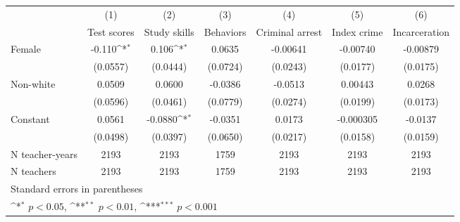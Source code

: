 {
\def\sym#1{\ifmmode^{#1}\else\(^{#1}\)\fi}
\begin{tabular}{l*{6}{c}}
\hline\hline
            &\multicolumn{1}{c}{(1)}&\multicolumn{1}{c}{(2)}&\multicolumn{1}{c}{(3)}&\multicolumn{1}{c}{(4)}&\multicolumn{1}{c}{(5)}&\multicolumn{1}{c}{(6)}\\
            &\multicolumn{1}{c}{Test scores}&\multicolumn{1}{c}{Study skills}&\multicolumn{1}{c}{Behaviors}&\multicolumn{1}{c}{Criminal arrest}&\multicolumn{1}{c}{Index crime}&\multicolumn{1}{c}{Incarceration}\\
\hline
Female      &      -0.110\sym{*}  &       0.106\sym{*}  &      0.0635         &    -0.00641         &    -0.00740         &    -0.00879         \\
            &    (0.0557)         &    (0.0444)         &    (0.0724)         &    (0.0243)         &    (0.0177)         &    (0.0175)         \\
[1em]
Non-white   &      0.0509         &      0.0600         &     -0.0386         &     -0.0513         &     0.00443         &      0.0268         \\
            &    (0.0596)         &    (0.0461)         &    (0.0779)         &    (0.0274)         &    (0.0199)         &    (0.0173)         \\
[1em]
Constant    &      0.0561         &     -0.0880\sym{*}  &     -0.0351         &      0.0173         &   -0.000305         &     -0.0137         \\
            &    (0.0498)         &    (0.0397)         &    (0.0650)         &    (0.0217)         &    (0.0158)         &    (0.0159)         \\
\hline
N teacher-years&        2193         &        2193         &        1759         &        2193         &        2193         &        2193         \\
N teachers  &        2193         &        2193         &        1759         &        2193         &        2193         &        2193         \\
\hline\hline
\multicolumn{7}{l}{\footnotesize Standard errors in parentheses}\\
\multicolumn{7}{l}{\footnotesize \sym{*} \(p<0.05\), \sym{**} \(p<0.01\), \sym{***} \(p<0.001\)}\\
\end{tabular}
}
